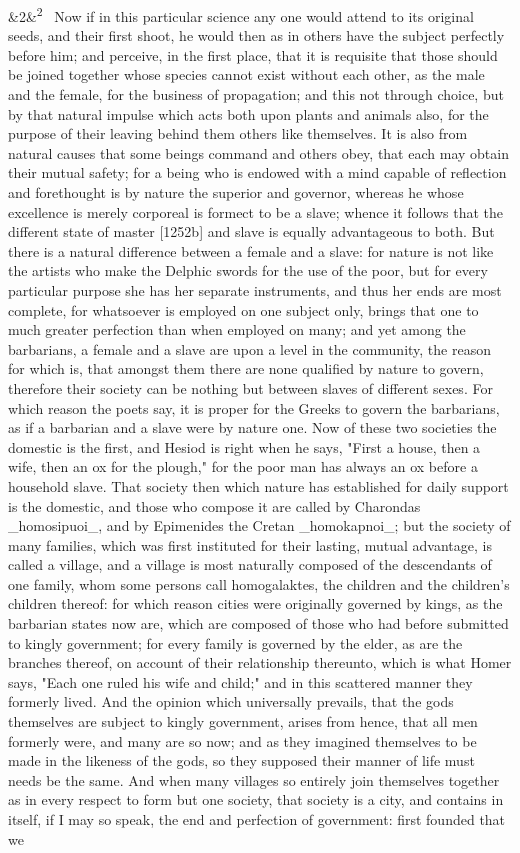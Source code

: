 \documentclass[12pt]{article}
\newcommand{\para}[1][]{\par\noindent\ifx&#1&\else\textsuperscript{\footnotesize #1}~\fi}
\begin{document}
\para[2] Now if in this particular science any one would attend to its original seeds, and their first shoot, he would then as in others have the subject perfectly before him; and perceive, in the first place, that it is requisite that those should be joined together whose species cannot exist without each other, as the male and the female, for the business of propagation; and this not through choice, but by that natural impulse which acts both upon plants and animals also, for the purpose of their leaving behind them others like themselves. It is also from natural causes that some beings command and others obey, that each may obtain their mutual safety; for a being who is endowed with a mind capable of reflection and forethought is by nature the superior and governor, whereas he whose excellence is merely corporeal is formect to be a slave; whence it follows that the different state of master [1252b] and slave is equally advantageous to both. But there is a natural difference between a female and a slave: for nature is not like the artists who make the Delphic swords for the use of the poor, but for every particular purpose she has her separate instruments, and thus her ends are most complete, for whatsoever is employed on one subject only, brings that one to much greater perfection than when employed on many; and yet among the barbarians, a female and a slave are upon a level in the community, the reason for which is, that amongst them there are none qualified by nature to govern, therefore their society can be nothing but between slaves of different sexes. For which reason the poets say, it is proper for the Greeks to govern the barbarians, as if a barbarian and a slave were by nature one. Now of these two societies the domestic is the first, and Hesiod is right when he says, "First a house, then a wife, then an ox for the plough," for the poor man has always an ox before a household slave. That society then which nature has established for daily support is the domestic, and those who compose it are called by Charondas \_homosipuoi\_, and by Epimenides the Cretan \_homokapnoi\_; but the society of many families, which was first instituted for their lasting, mutual advantage, is called a village, and a village is most naturally composed of the descendants of one family, whom some persons call homogalaktes, the children and the children's children thereof: for which reason cities were originally governed by kings, as the barbarian states now are, which are composed of those who had before submitted to kingly government; for every family is governed by the elder, as are the branches thereof, on account of their relationship thereunto, which is what Homer says, "Each one ruled his wife and child;" and in this scattered manner they formerly lived. And the opinion which universally prevails, that the gods themselves are subject to kingly government, arises from hence, that all men formerly were, and many are so now; and as they imagined themselves to be made in the likeness of the gods, so they supposed their manner of life must needs be the same. And when many villages so entirely join themselves together as in every respect to form but one society, that society is a city, and contains in itself, if I may so speak, the end and perfection of government: first founded that we 
\end{document}
